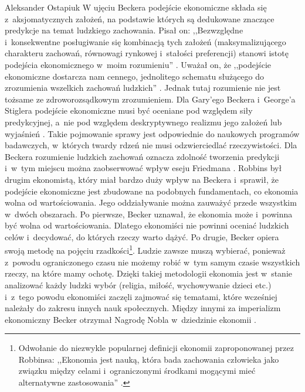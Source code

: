 \begin{artplenv}{Aleksander Ostapiuk}
W ujęciu Beckera podejście ekonomiczne składa się z~aksjomatycznych założeń, na podstawie których są dedukowane znaczące
predykcje na temat ludzkiego zachowania. Pisał on: ,,Bezwzględne i~konsekwentne posługiwanie się kombinacją tych założeń
(maksymalizującego charakteru zachowań, równowagi rynkowej i~stałości preferencji) stanowi istotę podejścia
ekonomicznego w~moim rozumieniu''
\parencite[s.~23]{becker_ekonomiczna_1990}.
Uważał on, że ,,podejście ekonomiczne
dostarcza nam cennego, jednolitego schematu służącego do zrozumienia wszelkich zachowań ludzkich''
\parencite[s.~38]{becker_ekonomiczna_1990}.
Jednak tutaj rozumienie nie jest tożsame ze zdroworozsądkowym
zrozumieniem. Dla Gary’ego Beckera i~George’a Stiglera
\parencite*{becker_gustibus_1977}
podejście ekonomiczne musi być oceniane pod względem
siły predykcyjnej, a~nie pod względem deskryptywnego realizmu jego założeń lub wyjaśnień
\parencite[s.~402–403]{becker_economic_1993}.
Takie pojmowanie sprawy jest odpowiednie do naukowych programów
badawczych, w~których twardy rdzeń nie musi odzwierciedlać rzeczywistości. Dla Beckera rozumienie ludzkich zachowań
oznacza zdolność tworzenia predykcji i~w~tym miejscu można zaobserwować wpływ eseju Friedmana
\parencite*{friedman_essays_1953}.
Robbins był drugim ekonomistą, który miał bardzo duży wpływ na Beckera i~sprawił, że
podejście ekonomiczne jest zbudowane na podobnych fundamentach, co ekonomia wolna od wartościowania. Jego oddziaływanie
można zauważyć przede wszystkim w~dwóch obszarach. Po pierwsze, Becker uznawał, że ekonomia może i~powinna być wolna od
wartościowania. Dlatego ekonomiści nie powinni oceniać ludzkich celów i~decydować, do których rzeczy warto dążyć. Po
drugie, Becker opiera swoją metodę na pojęciu rzadkości\footnote{Odwołanie do niezwykle popularnej definicji ekonomii
zaproponowanej przez Robbinsa: ,,Ekonomia jest nauką, która bada zachowania człowieka jako związku między
celami i~ograniczonymi środkami mogącymi mieć alternatywne zastosowania''
\parencite[s.~15]{robbins_essay_1935}.
}.
Ludzie zawsze muszą wybierać, ponieważ z~powodu ograniczonego czasu nie możemy robić w~tym samym czasie wszystkich rzeczy,
na które mamy ochotę. Dzięki takiej metodologii ekonomia jest w~stanie analizować każdy ludzki wybór (religia, miłość,
wychowywanie dzieci etc.) i~z~tego powodu ekonomiści zaczęli zajmować się tematami, które wcześniej należały
do zakresu innych nauk społecznych. Między innymi za imperializm ekonomiczny Becker otrzymał Nagrodę Nobla w~dziedzinie ekonomii
\parencite[s.~1]{noauthor_royal_1993}.


\end{artplenv}
